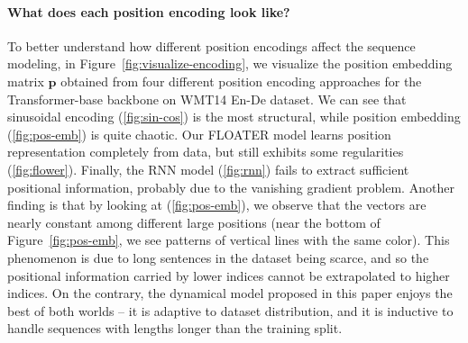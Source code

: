 \documentclass[11pt]{article}
\def\vp{{\bm{p}}}
\begin{document}
\paragraph{What does each position encoding look like? }
To better understand how different position encodings affect the sequence modeling, in Figure~\ref{fig:visualize-encoding}, we visualize the position embedding matrix $\vp$ obtained from four different position encoding approaches for the Transformer-base backbone on WMT14 En-De dataset. We can see that sinusoidal encoding (\ref{fig:sin-cos}) is the most structural, while position embedding (\ref{fig:pos-emb}) is quite chaotic. Our FLOATER model learns position representation completely from data, but still exhibits some regularities (\ref{fig:flower}). Finally, the RNN model (\ref{fig:rnn}) fails to extract sufficient positional information, probably due to the vanishing gradient problem. Another finding is that by looking at (\ref{fig:pos-emb}), we observe that the vectors are nearly constant among different large positions (near the bottom of Figure~\ref{fig:pos-emb}, we see patterns of vertical lines with the same color). This phenomenon is due to long sentences in the dataset being scarce, and so the positional information carried by lower indices cannot be extrapolated to higher indices. On the contrary, the dynamical model proposed in this paper enjoys the best of both worlds -- it is adaptive to dataset distribution, and it is inductive to handle sequences with lengths longer than the training split.
\end{document}
